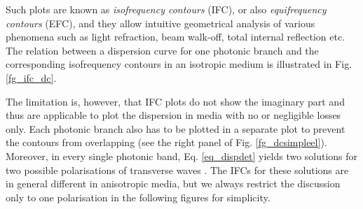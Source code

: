 Such plots are known as \textit{isofrequency contours} (IFC), or also \textit{equifrequency contours} (EFC), and they allow intuitive geometrical analysis of various phenomena such as light refraction, beam walk-off, total internal reflection etc. 
The relation between a dispersion curve for one photonic branch and the corresponding isofrequency contours in an isotropic medium is illustrated in Fig. \ref{fg_ifc_dc}.

The limitation is, however, that IFC plots do not show the imaginary part and thus are applicable to plot the dispersion in media with no or negligible losses only.  
Each photonic branch also has to be plotted in a separate plot to prevent the contours from overlapping (see the right panel of Fig. \ref{fg_dcsimpleel}). 
Moreover, in every single photonic band, Eq. \ref{eq_dispdet} yields two solutions for two possible polarisations of transverse waves \cite[p. 46]{klingshirn2007semiconductor}. The IFCs for these solutions are in general different in anisotropic media, but we always restrict the discussion only to one polarisation in the following figures for simplicity. 

